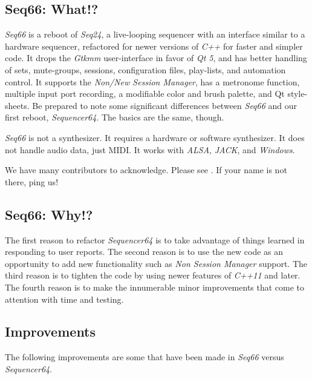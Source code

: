 \documentclass[
 11pt,
 twoside,
 a4paper,
 final                                 %
]{article}
\begin{document}
\subsection{Seq66: What!?}
\label{subsec:what_is_seq66}

   \textsl{Seq66} is
   a reboot of \textsl{Seq24},
   a live-looping sequencer with an interface similar to a hardware sequencer,
   refactored for newer versions of
   \textsl{C++} for faster and simpler code.
   It drops the
   \textsl{Gtkmm} user-interface in favor of \textsl{Qt 5},
   and has better handling of sets, mute-groups, sessions, configuration files,
   play-lists, and automation control.
   It supports the \textsl{Non/New Session Manager},
   has a metronome function,
   multiple input port recording,
   a modifiable color and brush palette,
   and Qt style-sheets.
   Be prepared to note some significant differences
   between \textsl{Seq66} and our first reboot, \textsl{Sequencer64}.
   The basics are the same, though.

   \textsl{Seq66} is not a synthesizer.
   It requires a hardware or software synthesizer.
   It does not handle audio data, just MIDI.
   It works with \textsl{ALSA}, \textsl{JACK},
   and \textsl{Windows}.

   We have many contributors to acknowledge.
   Please see .
   If your name is not there, ping us!

\subsection{Seq66: Why!?}
\label{subsec:introduction_vs_others}

   The first reason to refactor \textsl{Sequencer64} is to take advantage of
   things learned in responding to user reports.  The second reason is to use
   the new code as an opportunity to add new functionality such as
   \textsl{Non Session Manager} support.  The third reason is to tighten the
   code by using newer features of \textsl{C++11} and later.
   The fourth reason is to make the innumerable minor improvements that come to
   attention with time and testing.

\subsection{Improvements}
\label{subsec:improvements}

   The following improvements are some that have been made in
   \textsl{Seq66} versus \textsl{Sequencer64}.
\end{document}
